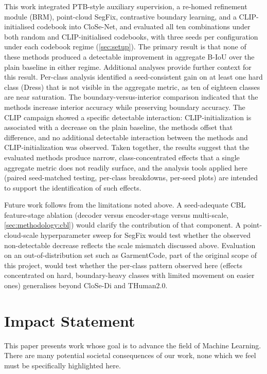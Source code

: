 \documentclass{article}
\theoremstyle{plain}
\theoremstyle{definition}
\theoremstyle{remark}
\begin{document}
This work integrated PTB-style auxiliary supervision, a re-homed refinement module (BRM), point-cloud SegFix, contrastive boundary learning, and a CLIP-initialised codebook into CloSe-Net, and evaluated all ten combinations under both random and CLIP-initialised codebooks, with three seeds per configuration under each codebook regime (\cref{sec:setup}). The primary result is that none of these methods produced a detectable improvement in aggregate B-IoU over the plain baseline in either regime. Additional analyses provide further context for this result. Per-class analysis identified a seed-consistent gain on at least one hard class (Dress) that is not visible in the aggregate metric, as ten of eighteen classes are near saturation. The boundary-versus-interior comparison indicated that the methods increase interior accuracy while preserving boundary accuracy. The CLIP campaign showed a specific detectable interaction: CLIP-initialization is associated with a decrease on the plain baseline, the methods offset that difference, and no additional detectable interaction between the methods and CLIP-initialization was observed. Taken together, the results suggest that the evaluated methods produce narrow, class-concentrated effects that a single aggregate metric does not readily surface, and the analysis tools applied here (paired seed-matched testing, per-class breakdowns, per-seed plots) are intended to support the identification of such effects.

Future work follows from the limitations noted above. A seed-adequate CBL feature-stage ablation (decoder versus encoder-stage versus multi-scale, \cref{sec:methodology:cbl}) would clarify the contribution of that component. A point-cloud-scale hyperparameter sweep for SegFix would test whether the observed non-detectable decrease reflects the scale mismatch discussed above. Evaluation on an out-of-distribution set such as GarmentCode, part of the original scope of this project, would test whether the per-class pattern observed here (effects concentrated on hard, boundary-heavy classes with limited movement on easier ones) generalises beyond CloSe-Di and THuman2.0.

\section*{Impact Statement}

This paper presents work whose goal is to advance the field of
Machine Learning. There are many potential societal consequences
of our work, none which we feel must be specifically highlighted here.



\end{document}
